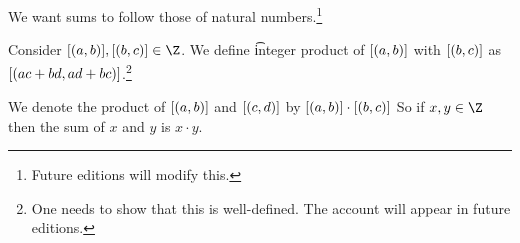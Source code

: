 
We want sums to follow those of natural numbers.\footnote{Future editions will modify this.}


Consider $\eqc{(a, b)}, \eqc{(b, c)} \in \Z$.
We define \t{integer product} of $[(a, b)]$ with $[(b, c)]$ as $[(ac + bd, ad + bc)]$.\footnote{One needs to show that this is well-defined. The account will appear in future editions.}


We denote the product of $[(a, b)]$ and $[(c, d)]$ by $[(a, b)] \cdot [(b, c)]$
So if $x, y \in \Z$ then the sum of $x$ and $y$ is $x \cdot y$.

\blankpage

